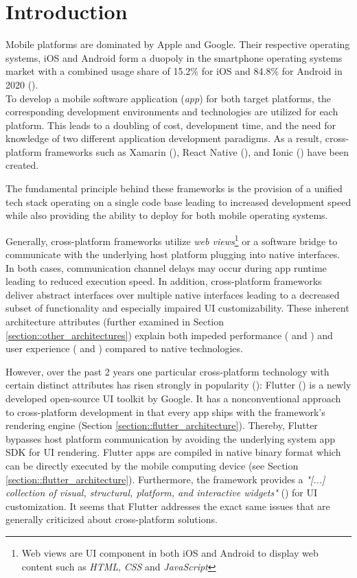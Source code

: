 \chapter{Introduction}
\label{section:introduction}
Mobile platforms are dominated by Apple and Google. Their respective operating systems, iOS and Android form a duopoly in the smartphone operating systems market with a combined usage share of 
15.2\% for iOS and 84.8\% for Android in 2020 (\cite{IDC2021}).
\\To develop a mobile software application (\textit{app}) for both target platforms, the corresponding development environments and technologies 
are utilized for each platform. This leads to a doubling of cost, development time, and 
the need for knowledge of two different application development paradigms. 
As a result, cross-platform frameworks such as Xamarin (\cite{Xamarin2021}), React Native (\cite{Facebook2021}), and Ionic (\cite{Ionic2021}) have been created. 

The fundamental principle behind these frameworks is the provision of a unified tech stack operating on a single code base leading to increased development speed
while also providing the ability to deploy for both mobile operating systems.

Generally, cross-platform frameworks utilize \textit{web views}\footnote{Web views are UI component in both iOS and Android to display web content such as \textit{HTML}, \textit{CSS} and \textit{JavaScript}} or a software bridge to communicate with the underlying host platform plugging into 
native interfaces. In both cases, communication channel delays may occur during app runtime leading to reduced execution speed. In addition, 
cross-platform frameworks deliver abstract interfaces over multiple native interfaces leading to a decreased subset of functionality
and especially impaired UI customizability. These inherent architecture attributes (further examined in Section \ref{section::other_architectures}) explain
both impeded performance (\cite{Ebone2018} and \cite{Corbalan2019}) and user experience (\cite{Mercado2016} and \cite{Angulo2014}) compared to native technologies.

However, over the past 2 years one particular cross-platform technology with certain distinct attributes has risen strongly in popularity (\cite{Statista2021}):
Flutter (\cite{FlutterDev20}) is a newly developed open-source UI toolkit by Google. 
It has a nonconventional approach to cross-platform development in that every app ships with the framework's rendering engine (Section \ref{section::flutter_architecture}). 
Thereby, Flutter bypasses host platform communication by avoiding the underlying system app SDK for UI rendering.
Flutter apps are compiled in native binary format which can be directly executed by the mobile computing device (see Section \ref{section::flutter_architecture}).
Furthermore, the framework provides a \textit{"[...] collection of visual, structural, platform, and interactive widgets"} (\cite[l.1]{GoogleWidgets2021}) for UI customization.
It seems that Flutter addresses the exact same issues that are generally criticized about cross-platform solutions.

